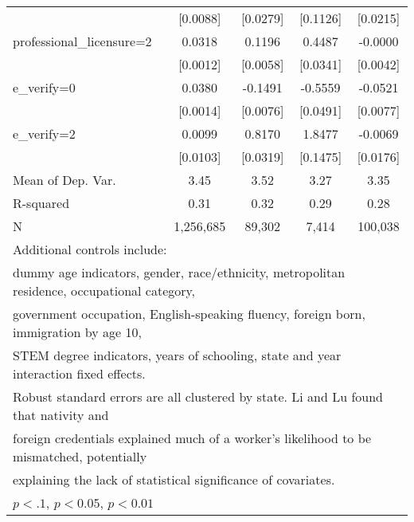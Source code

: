 \begin{table}[htbp]
\begin{tabular}{l*{4}{c}}
                    &    [0.0088]         &    [0.0279]         &    [0.1126]         &    [0.0215]         \\
\addlinespace
professional\_licensure=2&      0.0318\sym{***}&      0.1196\sym{***}&      0.4487\sym{***}&     -0.0000         \\
                    &    [0.0012]         &    [0.0058]         &    [0.0341]         &    [0.0042]         \\
\addlinespace
e\_verify=0          &      0.0380\sym{***}&     -0.1491\sym{***}&     -0.5559\sym{***}&     -0.0521\sym{***}\\
                    &    [0.0014]         &    [0.0076]         &    [0.0491]         &    [0.0077]         \\
\addlinespace
e\_verify=2          &      0.0099         &      0.8170\sym{***}&      1.8477\sym{***}&     -0.0069         \\
                    &    [0.0103]         &    [0.0319]         &    [0.1475]         &    [0.0176]         \\
\midrule
Mean of Dep. Var.   &        3.45         &        3.52         &        3.27         &        3.35         \\
R-squared           &        0.31         &        0.32         &        0.29         &        0.28         \\
N                   &   1,256,685         &      89,302         &       7,414         &     100,038         \\
\bottomrule
\multicolumn{5}{l}{\footnotesize Additional controls include:}\\
\multicolumn{5}{l}{\footnotesize dummy age indicators, gender, race/ethnicity, metropolitan residence, occupational category,}\\
\multicolumn{5}{l}{\footnotesize government occupation, English-speaking fluency, foreign born, immigration by age 10,}\\
\multicolumn{5}{l}{\footnotesize STEM degree indicators, years of schooling, state and year interaction fixed effects.}\\
\multicolumn{5}{l}{\footnotesize Robust standard errors are all clustered by state. Li and Lu found that nativity and}\\
\multicolumn{5}{l}{\footnotesize foreign credentials explained much of a worker's likelihood to be mismatched, potentially}\\
\multicolumn{5}{l}{\footnotesize explaining the lack of statistical significance of covariates.}\\
\multicolumn{5}{l}{\footnotesize \sym{*} \(p<.1\), \sym{**} \(p<0.05\), \sym{***} \(p<0.01\)}\\
\end{tabular}
\end{table}

